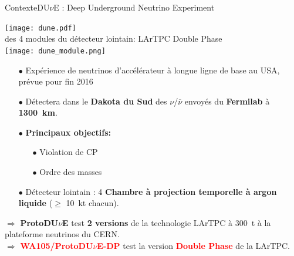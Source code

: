   \begin{frame}{Contexte}{DU$\nu$E : Deep Underground Neutrino Experiment}
     \begin{scriptsize}
    	\begin{minipage}{0.53\textwidth}
    		\centering
    		\texttt{[image: dune.pdf]}\\
    		\vspace{1cm}
    		 des 4 modules du détecteur lointain: LArTPC Double Phase\\
    		\texttt{[image: dune\_module.png]}\\
    		\vspace{1cm}
    	\end{minipage}
    	\hfill
    	\begin{minipage}{0.43\textwidth}
    		\begin{itemize}
    			\item[$\bullet$] Expérience de neutrinos d'accélérateur à longue ligne de base au USA, prévue pour fin 2016
    			\item[$\bullet$] Détectera dans le \textbf{Dakota du Sud} des $\nu$/$\overline{\nu}$ envoyés du \textbf{Fermilab} à \textbf{\SI{1300}{\kilo\meter}}.
    			\item[$\bullet$] \textbf{Principaux objectifs: }
	    			\begin{itemize}
	    				\item[$\bullet$] Violation de CP
	    				\item[$\bullet$] Ordre des masses
	    			\end{itemize}
    			\item[$\bullet$] Détecteur lointain : 4 \textbf{Chambre à projection temporelle à argon liquide} 
    			($\geq$ \SI{10}{\kilo\tonne} chacun).
    		\end{itemize}
    		\vspace{.3cm}
    		$\Rightarrow$ \textbf{ProtoDU$\nu$E} test \textbf{2 versions} de la technologie LArTPC  à \SI{300}{\tonne} à la plateforme neutrinos du CERN.\\
    		
    		$\Rightarrow$ \textcolor{red}{\textbf{WA105/ProtoDU$\nu$E-DP}} test la version \textcolor{red}{\textbf{Double Phase}} de la LArTPC.
	    \end{minipage}
	\end{scriptsize}
  \end{frame}

